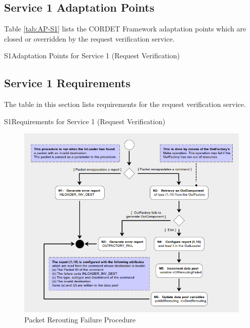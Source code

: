 \documentclass[a4paper,10pt]{article}
\newenvironment{cr_req}[2]
{
\begin{longtable}{|l|p{11.8cm}|}
\caption{#2}\label{tab:Req-#1} \\
\hline
\rowcolor{light-gray}
\textbf{Req. ID} & \textbf{Requirement Text}\\
\hline\hline
\endfirsthead
\rowcolor{light-gray}
\textbf{Req. ID} & \textbf{Requirement Text}\\
\hline\hline
\endhead
\DTLforeach*[\DTLiseq{\cat}{#1}]{dbReq}{\cat=Category,\type=Type,\id=Id,\reqText=Text}
{\DTLiffirstrow{}{\\\hline}P-\cat-\id/\type & \textit{\reqText}}\\\hline
}
{\end{longtable}}
\newenvironment{cr_ap}[2]
{
\begin{longtable}{|l|p{4.7cm}|p{6.9cm}|}
\caption{#2}\label{tab:AP-#1} \\
\hline
\rowcolor{light-gray}
\textbf{AP ID} & \textbf{Adaptation Point} & \textbf{Close-Out Value}\\
\hline\hline
\endfirsthead
\rowcolor{light-gray}
\textbf{AP ID} & \textbf{Adaptation Point} & \textbf{Close-Out Value}\\
\hline\hline
\endhead
\DTLforeach*[\DTLiseq{\cat}{#1}]{dbAP}{\cat=Category,\origin=Origin,\id=Id,\ap=AP,\defValue=DefValue}
{\DTLiffirstrow{}{\\\hline}P-\cat-\id & \ap\ (\origin) & \defValue}\\\hline
}
{\end{longtable}}
\begin{document}
\subsection{Service 1 Adaptation Points}\label{sec:serv1AP}
Table \ref{tab:AP-S1} lists the CORDET Framework adaptation points which are closed or overridden by the request verification service. 

\begin{cr_ap}{S1}{Adaptation Points for Service 1 (Request Verification)}
\end{cr_ap}


\subsection{Service 1 Requirements}
The table in this section lists requirements for the request verification service.

\begin{cr_req}{S1}{Requirements for Service 1 (Request Verification)}
\end{cr_req}


\newpage
\begin{figure}[H]
 \centering
 \includegraphics[scale=0.415,keepaspectratio=true]{CrPsPcktReroutingFail.png}
 \caption{Packet Rerouting Failure Procedure}
 \label{fig:PcktReroutingFail}
\end{figure}
\end{document}
